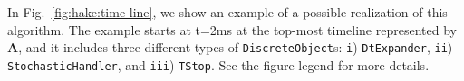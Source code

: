 In Fig.~\ref{fig:hake:time-line}, we show an example of a possible
realization of this algorithm. The example starts at t=2ms at the
top-most timeline represented by \textbf{A}, and it includes three
different types of \texttt{DiscreteObject}s: \texttt{i})
\texttt{DtExpander}, \texttt{ii}) \texttt{StochasticHandler}, and
\texttt{iii}) \texttt{TStop}. See the figure legend for more
details.\par
